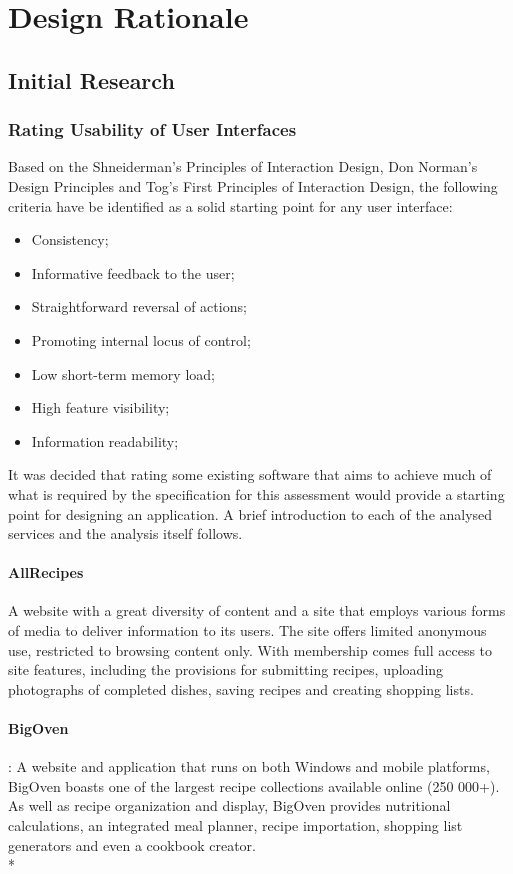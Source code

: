 \section{Design Rationale}

\subsection{Initial Research}

\subsubsection{Rating Usability of User Interfaces}
Based on the Shneiderman's Principles of Interaction Design, Don Norman's Design Principles and Tog's First Principles of Interaction Design, the following criteria have be identified as a solid starting point for any user interface:

\begin{itemize}
\item Consistency;
\item Informative feedback to the user;
\item Straightforward reversal of actions;
\item Promoting internal locus of control;
\item Low short-term memory load;
\item High feature visibility;
\item Information readability;
\end{itemize}

It was decided that rating some existing software that aims to achieve much of what is required by the specification for this assessment would provide a starting point for designing an application. A brief introduction to each of the analysed services and the analysis itself follows. 

\paragraph{AllRecipes} 
A website with a great diversity of content and a site that employs various forms 
of media to deliver information to its users. The site offers limited anonymous
use, restricted to browsing content only. With membership comes full access to 
site features, including the provisions for submitting recipes, uploading
photographs of completed dishes, saving recipes and creating shopping lists.

\paragraph{BigOven}: 
A website and application that runs on both Windows and mobile platforms, BigOven
boasts one of the largest recipe collections available online (250 000+). As well
as recipe organization and display, BigOven provides nutritional calculations,
an integrated meal planner, recipe importation, shopping list generators and even 
a cookbook creator.
\\*

